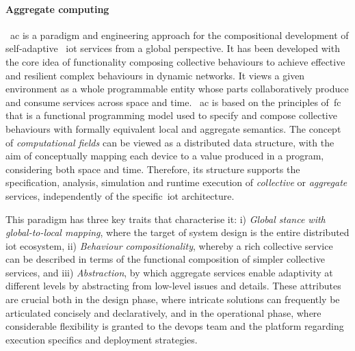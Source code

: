 \paragraph{Aggregate computing}
~\ac{ac} is a paradigm and engineering approach for the compositional development of self-adaptive ~\ac{iot} services
from a global perspective.
It has been developed with the core idea of functionality composing collective behaviours to achieve effective and resilient
complex behaviours in dynamic networks.
It views a given environment as a whole programmable entity whose parts collaboratively produce and consume services
across space and time.
~\ac{ac} is based on the principles of~\ac{fc} that is a functional programming model used to specify
and compose collective behaviours with formally equivalent local and aggregate semantics.
The concept of \emph{computational fields} can be viewed as a distributed data structure,
with the aim of conceptually mapping each device to a value produced in a program, considering both
space and time.
Therefore, its structure supports the specification, analysis, simulation and runtime execution of \emph{collective}
or \emph{aggregate} services, independently of the specific~\ac{iot} architecture.

This paradigm has three key traits that characterise it:
    i) \emph{Global stance with global-to-local mapping}, where the target of system design is the entire distributed
        \ac{iot} ecosystem,
    ii) \emph{Behaviour compositionality}, whereby a rich collective service can be described in terms of the functional
        composition of simpler collective services, and
    iii) \emph{Abstraction}, by which aggregate services enable adaptivity at different levels by abstracting from low-level
        issues and details.
These attributes are crucial both in the design phase, where intricate solutions can frequently be articulated concisely
and declaratively, and in the operational phase, where considerable flexibility is granted to the devops team and the
platform regarding execution specifics and deployment strategies.

